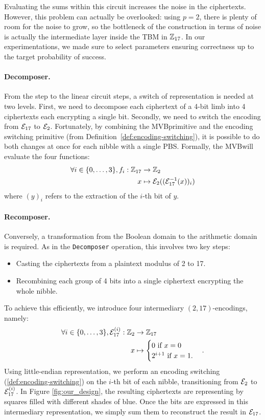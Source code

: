 Evaluating the sums within this circuit increases the noise in the ciphertexts. However, this problem can actually be overlooked: using $p=2$, there is plenty of room for the noise to grow, so the bottleneck of the construction in terms of noise is actually the intermediate layer inside the \gls{TBM} in $\mathbb{Z}_{17}$. In our experimentations, we made sure to select parameters ensuring correctness up to the target probability of success.


\paragraph{Decomposer.} From the \SubBytes step to the linear circuit steps, a switch of representation is needed at two levels. First, we need to decompose each ciphertext of a 4-bit limb into 4 ciphertexts each encrypting a single bit. Secondly, we need to switch the encoding from $\mathcal{E}_{17}$ to $\mathcal{E}_2$. Fortunately, by combining the \gls{MVB}primitive and the encoding switching primitive (from Definition~\ref{def:encoding-switching}), it is possible to do both changes at once for each nibble with a single \gls{PBS}. Formally, the \gls{MVB}will evaluate the four functions:
\begin{align*}
    \forall i \in \{0, \dots, 3\}, f_i: \mathbb{Z}_{17} &\rightarrow \mathbb{Z}_2\\
                                       x &\mapsto \mathcal{E}_2((\mathcal{E}_{17}^{-1}(x))_i)
\end{align*}
where $(y)_i$ refers to the extraction of the $i$-th bit of $y$.


\paragraph{Recomposer.} Conversely, a transformation from the Boolean domain to the arithmetic domain is required. As in the \texttt{Decomposer} operation, this involves two key steps:
\begin{itemize}
    \item Casting the ciphertexts from a plaintext modulus of 2 to 17.
    \item Recombining each group of 4 bits into a single ciphertext encrypting the whole nibble.
\end{itemize}
To achieve this efficiently, we introduce four intermediary $(2, 17)$-encodings, namely:
\begin{align*}
    \forall i \in \{0, \dots, 3\}, \mathcal{E}_{17}^{(i)}: \mathbb{Z}_2 &\rightarrow \mathbb{Z}_{17}\\
    x &\mapsto \begin{cases}
    0 \text{ if } x=0\\
    2^{i+1} \text{ if } x=1.
    \end{cases}.
\end{align*}
%
Using little-endian representation, we perform an encoding switching (\ref{def:encoding-switching}) on the $i$-th bit of each nibble, transitioning from $\mathcal{E}_2$ to $\mathcal{E}_{17}^{(i)}$. In Figure \ref{fig:our_design}, the resulting ciphertexts are representing by squares filled with different shades of blue. Once the bits are expressed in this intermediary representation, we simply sum them to reconstruct the result in $\mathcal{E}_{17}$.

